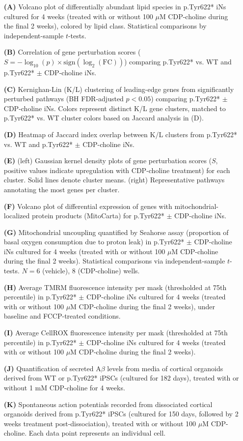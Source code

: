 \documentclass[12pt]{article}
\begin{document}
\begin{itemize}
    \item[\textbf{(A)}] Volcano plot of differentially abundant lipid species in p.Tyr622* iNs cultured for 4 weeks (treated with or without 100 $\mu$M CDP-choline during the final 2 weeks), colored by lipid class.  Statistical comparisons by independent-sample $t$-tests.
    \item[\textbf{(B)}] Correlation of gene perturbation scores ($S = -\log_{10}(p)\times\text{sign}(\log_2(\text{FC}))$) comparing p.Tyr622* vs. WT and p.Tyr622* $\pm$ CDP-choline iNs.
    \item[\textbf{(C)}] Kernighan-Lin (K/L) clustering of leading-edge genes from significantly perturbed pathways (BH FDR-adjusted $p<0.05$) comparing p.Tyr622* $\pm$ CDP-choline iNs. Colors represent distinct K/L gene clusters, matched to p.Tyr622* vs. WT cluster colors based on Jaccard analysis in (D).
    \item[\textbf{(D)}] Heatmap of Jaccard index overlap between K/L clusters from p.Tyr622* vs. WT and p.Tyr622* $\pm$ CDP-choline iNs.
    \item[\textbf{(E)}] (left) Gaussian kernel density plots of gene perturbation scores ($S$, positive values indicate upregulation with CDP-choline treatment) for each cluster. Solid lines denote cluster means. (right) Representative pathways annotating the most genes per cluster.
    \item[\textbf{(F)}] Volcano plot of differential expression of genes with mitochondrial-localized protein products (MitoCarta) for p.Tyr622* $\pm$ CDP-choline iNs.
    \item[\textbf{(G)}] Mitochondrial uncoupling quantified by Seahorse assay (proportion of basal oxygen consumption due to proton leak) in p.Tyr622* $\pm$ CDP-choline iNs cultured for 4 weeks (treated with or without 100 $\mu$M CDP-choline during the final 2 weeks). Statistical comparisons via independent-sample $t$-tests. $N=6$ (vehicle), $8$ (CDP-choline) wells.
    \item[\textbf{(H)}] Average TMRM fluorescence intensity per mask (thresholded at 75th percentile) in p.Tyr622* $\pm$ CDP-choline iNs cultured for 4 weeks (treated with or without 100 $\mu$M CDP-choline during the final 2 weeks), under baseline and FCCP-treated conditions.
    \item[\textbf{(I)}] Average CellROX fluorescence intensity per mask (thresholded at 75th percentile) in p.Tyr622* $\pm$ CDP-choline iNs cultured for 4 weeks (treated with or without 100 $\mu$M CDP-choline during the final 2 weeks).
    \item[\textbf{(J)}] Quantification of secreted A$\beta$ levels from media of cortical organoids derived from WT or p.Tyr622* iPSCs (cultured for 182 days), treated with or without 1 mM CDP-choline for 4 weeks.
    \item[\textbf{(K)}] Spontaneous action potentials recorded from dissociated cortical organoids derived from p.Tyr622* iPSCs (cultured for 150 days, followed by 2 weeks treatment post-dissociation), treated with or without 100 $\mu$M CDP-choline. Each data point represents an individual cell.
\end{itemize} \clearpage
\end{document}
